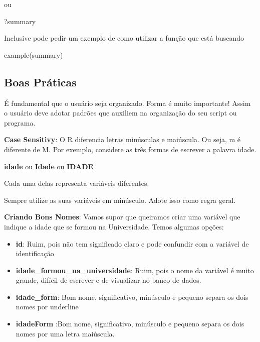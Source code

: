 \documentclass[
  letterpaper,
  DIV=11,
  numbers=noendperiod]{scrreprt}
\newenvironment{Shaded}{\begin{snugshade}}{\end{snugshade}}
\newcommand{\FunctionTok}[1]{\textcolor[rgb]{0.28,0.35,0.67}{#1}}
\newcommand{\NormalTok}[1]{\textcolor[rgb]{0.00,0.23,0.31}{#1}}
\providecommand{\tightlist}{%
  \setlength{\itemsep}{0pt}\setlength{\parskip}{0pt}}
\begin{document}
ou

\begin{Shaded}
\begin{Highlighting}[]
\NormalTok{?summary}
\end{Highlighting}
\end{Shaded}

Inclusive pode pedir um exemplo de como utilizar a função que está
buscando

\begin{Shaded}
\begin{Highlighting}[]
\FunctionTok{example}\NormalTok{(summary)}
\end{Highlighting}
\end{Shaded}

\subsection{Boas Práticas}\label{boas-pruxe1ticas}

É fundamental que o usuário seja organizado. Forma é muito importante!
Assim o usuário deve adotar padrões que auxiliem na organização do seu
script ou programa.

\textbf{Case Sensitivy}: O R diferencia letras minúsculas e maiúscula.
Ou seja, m é diferente de M. Por exemplo, considere as três formas de
escrever a palavra idade.

\textbf{idade} ou \textbf{Idade} ou \textbf{IDADE}

Cada uma delas representa variáveis diferentes.

\begin{tcolorbox}[enhanced jigsaw, leftrule=.75mm, coltitle=black, colframe=quarto-callout-tip-color-frame, toprule=.15mm, opacitybacktitle=0.6, bottomtitle=1mm, bottomrule=.15mm, titlerule=0mm, toptitle=1mm, title=\textcolor{quarto-callout-tip-color}{\faLightbulb}\hspace{0.5em}{DICA}, arc=.35mm, breakable, opacityback=0, colbacktitle=quarto-callout-tip-color!10!white, colback=white, left=2mm, rightrule=.15mm]

Sempre utilize as suas variáveis em minúsculo. Adote isso como regra
geral.

\end{tcolorbox}

\textbf{Criando Bons Nomes}: Vamos supor que queiramos criar uma
variável que indique a idade que se formou na Universidade. Temos
algumas opções:

\begin{itemize}
\tightlist
\item
  \textbf{id}: Ruim, pois não tem significado claro e pode confundir com
  a variável de identificação
\item
  \textbf{idade\_formou\_na\_universidade}: Ruim, pois o nome da
  variável é muito grande, difícil de escrever e de visualizar no banco
  de dados.
\item
  \textbf{idade\_form}: Bom nome, significativo, minúsculo e pequeno
  separa os dois nomes por underline
\item
  \textbf{idadeForm} :Bom nome, significativo, minúsculo e pequeno
  separa os dois nomes por uma letra maiúscula.
\end{itemize}
\end{document}
